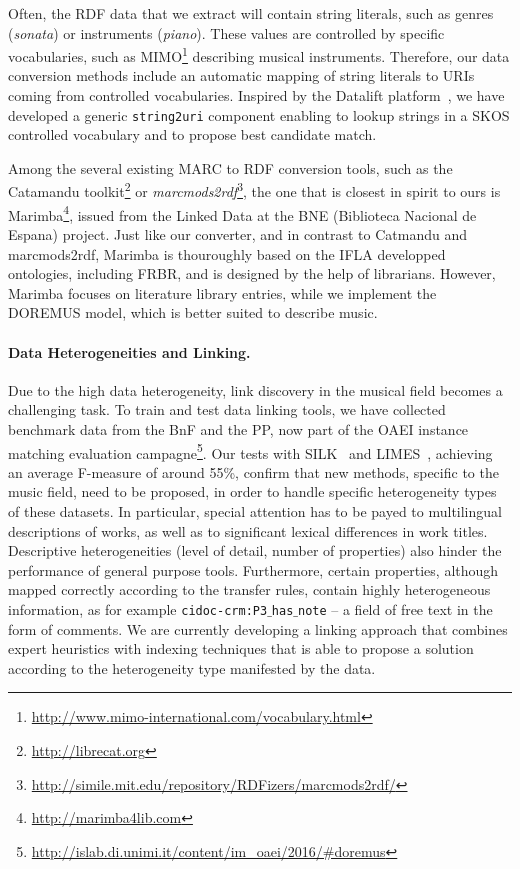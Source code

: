 \documentclass[runningheads,a4paper]{llncs}
\begin{document}
\vspace{-0.5cm}
Often, the RDF data that we extract will contain string literals, such as genres ({\it sonata}) or instruments ({\it piano}). These values are controlled by specific vocabularies, such as MIMO\footnote{\url{http://www.mimo-international.com/vocabulary.html}} describing musical instruments. Therefore, our data conversion methods include an automatic mapping of string literals to URIs coming from controlled vocabularies. Inspired by the Datalift platform~\cite{datalift}, we have developed a generic \texttt{string2uri} component enabling to lookup strings in a SKOS controlled vocabulary and to propose best candidate match.

Among the several existing MARC to RDF conversion tools, such as the Catamandu toolkit\footnote{\url{http://librecat.org}} or {\it marcmods2rdf}\footnote{\url{http://simile.mit.edu/repository/RDFizers/marcmods2rdf/}}, the one that is closest in spirit to ours is Marimba\footnote{\url{http://marimba4lib.com}}, issued from the Linked Data at the BNE (Biblioteca Nacional de Espana) project. Just like our converter, and in contrast to Catmandu and marcmods2rdf, Marimba is thouroughly based on the IFLA developped ontologies, including FRBR, and is designed by the help of librarians. However, Marimba focuses on literature library entries, while we implement the DOREMUS model, which is better suited to describe music.

\paragraph{{\bf Data Heterogeneities and Linking.}} Due to the high data heterogeneity, link discovery in the musical field becomes a challenging task. To train and test data linking tools, we have collected benchmark data from the BnF and the PP, now part of the OAEI instance matching evaluation campagne\footnote{\url{http://islab.di.unimi.it/content/im_oaei/2016/\#doremus}}. Our tests with SILK~\cite{jentzsch2010silk} and LIMES~\cite{ngomo2011limes}, achieving an average F-measure of around 55\%, confirm that new methods, specific to the music field, need to be proposed, in order to handle specific heterogeneity types of these datasets. In particular, special attention has to be payed to multilingual descriptions of works, as well as to significant lexical differences in work titles. Descriptive heterogeneities (level of detail, number of properties) also hinder the performance of general purpose tools. Furthermore, certain properties, although mapped correctly according to the transfer rules, contain highly heterogeneous information, as for example \texttt{cidoc-crm:P3$\_$has$\_$note} -- a field of free text in the form of comments. We are currently developing a linking approach that combines expert heuristics with indexing techniques that is able to propose a solution according to the heterogeneity type manifested by the data.
\end{document}
